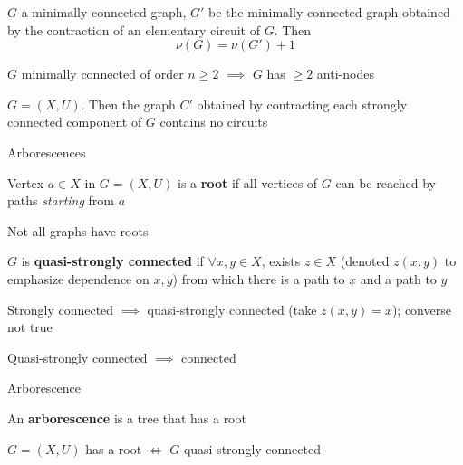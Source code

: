 \documentclass[aspectratio=169]{beamer}
\begin{document}
\begin{frame} 
\begin{theorem}
$G$ a minimally connected graph, $G'$ be the minimally connected graph obtained by the contraction of an elementary circuit of $G$.	Then
\[
\nu(G)=\nu(G')+1
\]
\end{theorem}
\vfill
\begin{theorem}
$G$ minimally connected of order $n\geq 2$ $\implies$ $G$ has $\geq 2$ anti-nodes
\end{theorem}
\vfill
\begin{theorem}
$G=(X,U)$. Then the graph $C'$ obtained by contracting each strongly connected component of $G$ contains no circuits
\end{theorem}
\end{frame}


\begin{frame}{Arborescences}
\begin{definition}[Root]
Vertex $a\in X$ in $G=(X,U)$ is a \textbf{root} if all vertices of $G$ can be reached by paths \emph{starting} from $a$
\end{definition}
Not all graphs have roots
\vfill
\begin{definition}
$G$ is \textbf{quasi-strongly connected} if $\forall x,y\in X$, exists $z\in X$ (denoted $z(x,y)$ to emphasize dependence on $x,y$) from which there is a path to $x$ and a path to $y$
\end{definition}
Strongly connected $\implies$ quasi-strongly connected (take $z(x,y)=x$); converse not true

Quasi-strongly connected $\implies$ connected
\end{frame}

\begin{frame}{Arborescence}
\begin{definition}[Arborescence]
An \textbf{arborescence} is a tree that has a root
\end{definition}
\vfill
\begin{lemma}
$G=(X,U)$ has a root $\iff$ $G$ quasi-strongly connected
\end{lemma}
\end{frame}
\end{document}
